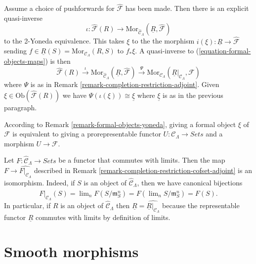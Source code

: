 \begin{remark}
\medskip \noindent
Assume a choice of pushforwards for $\widehat{\mathcal{F}}$ has been made.
Then there is an explicit quasi-inverse
$$
\iota :
\widehat{\mathcal{F}}(R) \longrightarrow
\text{Mor}_{\widehat{\mathcal{C}}_\Lambda}(
\underline{R}, \widehat{\mathcal{F}})
$$
to the 2-Yoneda equivalence. This takes $\xi$ to the the morphism
$i(\xi) : \underline{R} \to \widehat{\mathcal{F}}$ sending
$f \in \underline{R}(S) = \text{Mor}_{\mathcal{C}_\Lambda}(R, S)$
to $f_*\xi$. A quasi-inverse to (\ref{equation-formal-objects-maps})
is then
$$
\widehat{\mathcal{F}}(R)
\xrightarrow {\iota}
\text{Mor}_{\widehat{\mathcal{C}}_\Lambda}(
\underline{R}, \widehat{\mathcal{F}})
\xrightarrow{\Psi}
\text{Mor}_{\mathcal{C}_\Lambda}(
\underline{R}|_{\mathcal{C}_\Lambda}, \mathcal{F})
$$
where $\Psi$ is as in
Remark \ref{remark-completion-restriction-adjoint}.  
Given $\xi \in \text{Ob}(\widehat{\mathcal{F}}(R))$ we have
$\Psi(\iota(\xi)) \cong \underline{\xi}$ where
$\underline{\xi}$ is as in the previous paragraph.
\end{remark}

\begin{remark}
\label{remark-spell-out-formal-object}
According to Remark \ref{remark-formal-objects-yoneda}, giving a formal object 
$\xi$ of $\mathcal{F}$ is equivalent to giving a prorepresentable functor $U: 
\mathcal{C}_\Lambda \to \textit{Sets}$ and a morphism $U 
\to \mathcal{F}$. 
\end{remark}

\begin{remark}
\label{remark-restrict-complete-continuous-functor}
Let $F : \widehat{\mathcal{C}}_\Lambda \to \textit{Sets}$
be a functor that commutes with limits.
Then the map $F \to \widehat{F|_{\mathcal{C}_\Lambda}}$ described in 
Remark \ref{remark-completion-restriction-cofset-adjoint}
is an isomorphism. Indeed, if $S$ is 
an object of $\widehat{\mathcal{C}}_\Lambda$, then we have canonical
bijections
$$
\widehat{F|_{\mathcal{C}_\Lambda}}(S) =
\lim\nolimits_n F(S/\mathfrak{m}_{S}^n) =
F(\lim\nolimits_n S/\mathfrak{m}_{S}^n) = F(S).
$$
In particular, if $R$ is an object of $\widehat{\mathcal{C}}_\Lambda$ then 
$\underline{R} = \widehat{\underline{R}|_{\mathcal{C}_\Lambda}}$ because
the representable functor $\underline{R}$ commutes with limits by definition
of limits.
\end{remark}




\section{Smooth morphisms}
\label{section-smooth-morphisms}

